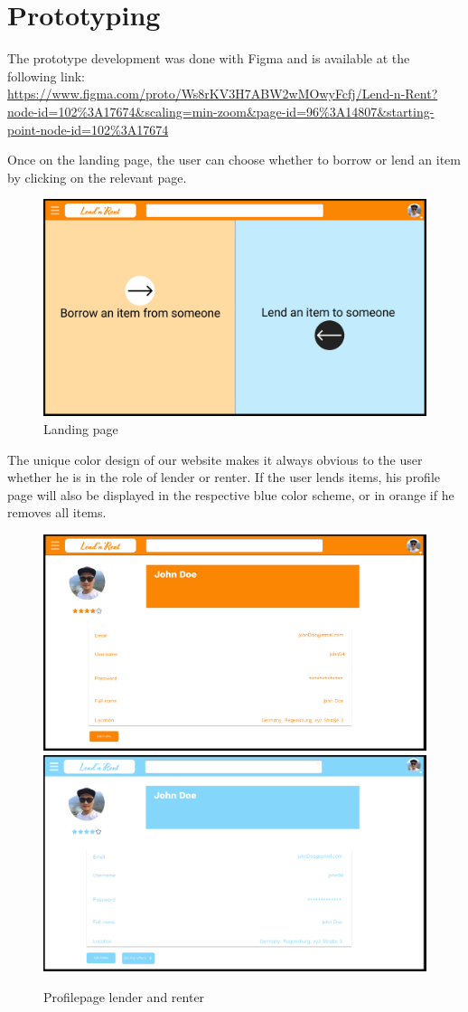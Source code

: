 \section{Prototyping}

The prototype development was done with Figma and is available at the following link: \\ \url{https://www.figma.com/proto/Ws8rKV3H7ABW2wMOwyFcfj/Lend-n-Rent?node-id=102%3A17674&scaling=min-zoom&page-id=96%3A14807&starting-point-node-id=102%3A17674}

\noindent
Once on the landing page, the user can choose whether to borrow or lend an item by clicking on the relevant page.

\begin{figure}[H]
	\centering
	\includegraphics[width=0.5\linewidth]{abb/1landing}
	\caption{Landing page}
	\label{fig:1landing}
\end{figure} 

\noindent
The unique color design of our website makes it always obvious to the user whether he is in the role of lender or renter. If the user lends items, his profile page will also be displayed in the respective blue color scheme, or in orange if he removes all items.

\begin{figure}[H]
	\centering
	\includegraphics[width=0.49\linewidth]{abb/11profilerent}
	\includegraphics[width=0.49\linewidth]{abb/6profilelend}
	\caption{Profilepage lender and renter}
	\label{fig:profile}
	\centering
\end{figure}

